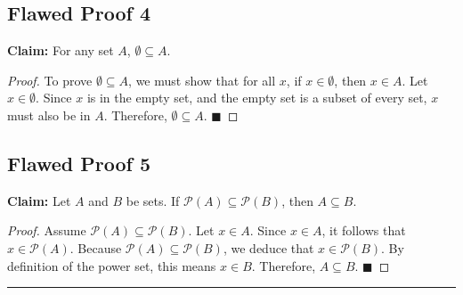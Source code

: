 \documentclass[11pt]{article}
\theoremstyle{definition}
\theoremstyle{remark}
\begin{document}
\subsection{Flawed Proof 4}
\textbf{Claim:} For any set $A$, $\emptyset \subseteq A$.
\begin{proof}
To prove $\emptyset \subseteq A$, we must show that for all $x$, if $x \in \emptyset$, then $x \in A$. 
Let $x \in \emptyset$. Since $x$ is in the empty set, and the empty set is a subset of every set, $x$ must also be in $A$. Therefore, $\emptyset \subseteq A$. $\blacksquare$
\end{proof}

\subsection{Flawed Proof 5}
\textbf{Claim:} Let $A$ and $B$ be sets. If $\mathcal{P}(A) \subseteq \mathcal{P}(B)$, then $A \subseteq B$.
\begin{proof}
Assume $\mathcal{P}(A) \subseteq \mathcal{P}(B)$. Let $x \in A$. 
Since $x \in A$, it follows that $x \in \mathcal{P}(A)$. 
Because $\mathcal{P}(A) \subseteq \mathcal{P}(B)$, we deduce that $x \in \mathcal{P}(B)$. 
By definition of the power set, this means $x \in B$. 
Therefore, $A \subseteq B$. $\blacksquare$
\end{proof}

\vspace{1cm}
\hrule
\vspace{0.5cm}
\end{document}
